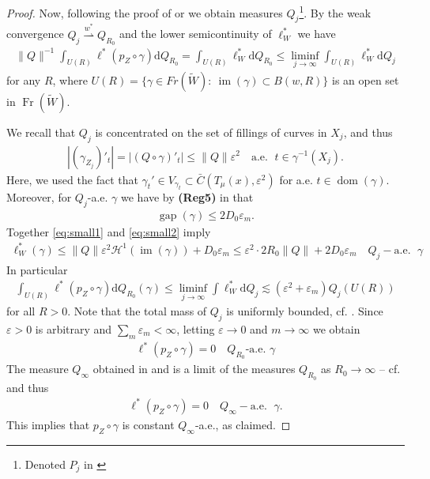 \documentclass{amsart}
\numberwithin{equation}{section}
\newcommand{\Ha}{\mathcal{H}}
\newcommand{\im}{\operatorname{im}}
\newcommand{\gap}{\operatorname{gap}}
\newcommand{\dom}{\operatorname{dom}}
\newcommand{\Fr}{\operatorname{Fr}}
\newcommand{\ud}{\mathrm {d}}
\newcommand{\inv}{^{-1}}
\begin{document}
\begin{proof}
Now, following the proof of \cite[Theorem 3.11]{sch16a} or \cite[Theorems 7.18 and 7.22]{CKS} we obtain measures $Q_j$\footnote{Denoted $P_j$ in \cite{CKS}}. By the weak convergence $Q_j\stackrel{w^*}{\rightharpoonup} Q_{R_0}$ and the lower semicontinuity of $\ell_W^*$ we have
\begin{align*}
   \|Q\|\inv \int_{U(R)}\ell^*(p_Z\circ\gamma)\ud Q_{R_0}=\int_{U(R)}\ell^*_W\ud Q_{R_0}\le \liminf_{j\to \infty}\int_{U(R)}\ell^*_W\ud Q_j
\end{align*}
for any $R$, where $U(R)=\{\gamma\in Fr(\widetilde W):\ \im(\gamma)\subset B(w,R)\}$ is an open set in $\Fr(\widetilde W)$. 

We recall that $Q_j$ is concentrated on the set of fillings of curves in $X_j$, and thus
\begin{align}\label{eq:small1}
    |(\gamma_{Z_j})'_t|=|(Q\circ\gamma)'_t|\le \|Q\|\varepsilon^2\quad\mbox{a.e. }\; t\in \gamma\inv(X_j).
\end{align}
Here, we used the fact that $\gamma_t'\in V_{\gamma_t}\subset \bar C(T_\mu(x),\varepsilon^2)$ for a.e. $t\in \dom(\gamma)$. Moreover, for $Q_j$-a.e. $\gamma$ we have by {\bf (Reg5)} in \cite[Section 7]{CKS} that 
\begin{align}\label{eq:small2}
    \gap(\gamma)\le 2D_0\varepsilon_m.
\end{align}
Together \eqref{eq:small1} and \eqref{eq:small2} imply 
\begin{align*}
    \ell_W^*(\gamma)\le \|Q\|\varepsilon^2\Ha^1(\im(\gamma))+D_0\varepsilon_m\le \varepsilon^2\cdot 2R_0\|Q\|+2D_0\varepsilon_m\quad Q_j-\mbox{a.e. }\; \gamma
\end{align*}
In particular 
\begin{align*}
    \int_{U(R)}\ell^*(p_Z\circ\gamma)\ud Q_{R_0}(\gamma)\le \liminf_{j\to\infty}\int \ell_W^*\ud Q_j\lesssim (\varepsilon^2+\varepsilon_m)Q_j(U(R))
\end{align*}
for all $R>0$. Note that the total mass of $Q_j$ is uniformly bounded, cf. \cite[(7.78)]{CKS}. Since $\varepsilon>0$ is arbitrary and $\sum_m\varepsilon_m<\infty$, letting $\varepsilon\to 0$ and $m\to \infty$ we obtain 
\begin{align*}
\ell^*(p_Z\circ\gamma)=0\quad Q_{R_0}\mbox{-a.e. }\gamma
\end{align*}
The measure $Q_\infty$ obtained in \cite[Theorem 3.11 and Corollary 3.14]{sch16a} and \cite[Theorem 7.18]{CKS} is a limit of the measures $Q_{R_0}$ as $R_0\to\infty$ -- cf. \cite[Lemma 7.85]{CKS} and thus 
\begin{align*}
\ell^*(p_Z\circ\gamma)=0\quad Q_\infty-\mbox{a.e. }\; \gamma.
\end{align*}
This implies that $p_Z\circ \gamma$ is constant $Q_\infty$-a.e., as claimed.
\end{proof}
\end{document}
